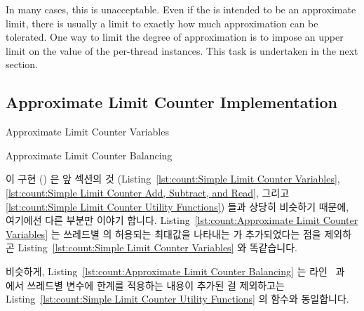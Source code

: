 \begin{lineref}
In many cases, this is unacceptable.
Even if the  is intended to be an approximate limit,
there is usually a limit to exactly how much approximation can be tolerated.
One way to limit the degree of approximation is to impose an upper limit
on the value of the per-thread  instances.
This task is undertaken in the next section.
\fi

\subsection{Approximate Limit Counter Implementation}
\label{sec:count:Approximate Limit Counter Implementation}
\NoIndentAfterThis

\begin{listing}[tbp]

\caption{Approximate Limit Counter Variables}
\label{lst:count:Approximate Limit Counter Variables}
\end{listing}

\begin{listing}[tbp]

\caption{Approximate Limit Counter Balancing}
\label{lst:count:Approximate Limit Counter Balancing}
\end{listing}

이 구현 () 은 앞 섹션의 것
(Listing~\ref{lst:count:Simple Limit Counter Variables},
\ref{lst:count:Simple Limit Counter Add, Subtract, and Read}, 그리고
\ref{lst:count:Simple Limit Counter Utility Functions}) 들과 상당히 비슷하기
때문에, 여기에선 다른 부분만 이야기 합니다.
Listing~\ref{lst:count:Approximate Limit Counter Variables} 는 쓰레드별
 의 허용되는 최대값을 나타내는  가
추가되었다는 점을 제외하곤
Listing~\ref{lst:count:Simple Limit Counter Variables} 와 똑같습니다.

\begin{lineref}
비슷하게,
Listing~\ref{lst:count:Approximate Limit Counter Balancing} 는
라인~ 과~ 에서 쓰레드별 
변수에  한계를 적용하는 내용이 추가된 걸 제외하고는
Listing~\ref{lst:count:Simple Limit Counter Utility Functions} 의
 함수와 동일합니다.
\iffalse


\end{lineref}
\end{lineref}
